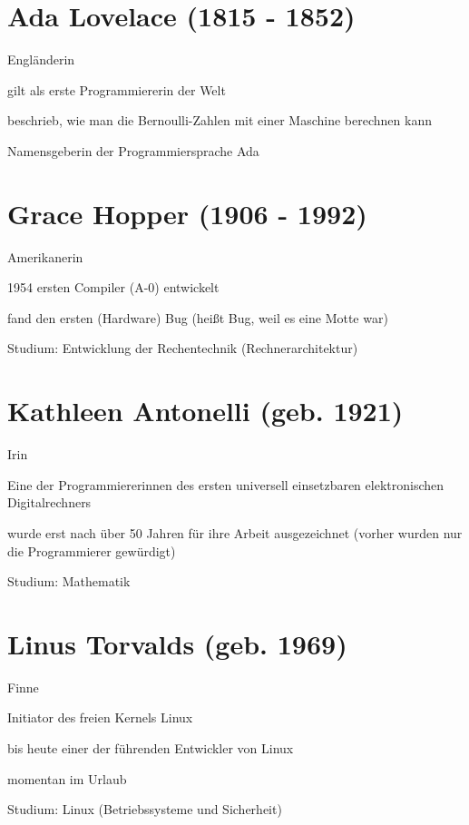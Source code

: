 \documentclass[a4paper,12pt]{report}
\begin{document}
\section*{Ada Lovelace (1815 - 1852)}
\begin{itemize*}
    \item Engländerin
    \item gilt als erste Programmiererin der Welt
    \item beschrieb, wie man die Bernoulli-Zahlen mit einer Maschine berechnen kann
    \item Namensgeberin der Programmiersprache Ada
\end{itemize*}

\section*{Grace Hopper (1906 - 1992)}
\begin{itemize*}
    \item Amerikanerin
    \item 1954 ersten Compiler (A-0) entwickelt
    \item fand den ersten (Hardware) Bug (heißt Bug, weil es eine Motte war)
    \item Studium: Entwicklung der Rechentechnik (Rechnerarchitektur)
\end{itemize*}


\section*{Kathleen Antonelli (geb. 1921)}
\begin{itemize*}
    \item Irin
    \item Eine der Programmiererinnen des ersten universell einsetzbaren elektronischen Digitalrechners
    \item wurde erst nach über 50 Jahren für ihre Arbeit ausgezeichnet (vorher wurden nur die Programmierer gewürdigt)
    \item Studium: Mathematik
\end{itemize*}

\section*{Linus Torvalds (geb. 1969)}
\begin{itemize*}
    \item Finne
    \item Initiator des freien Kernels Linux
    \item bis heute einer der führenden Entwickler von Linux
    \item momentan im Urlaub
    \item Studium: Linux (Betriebssysteme und Sicherheit)
\end{itemize*}
\end{document}
